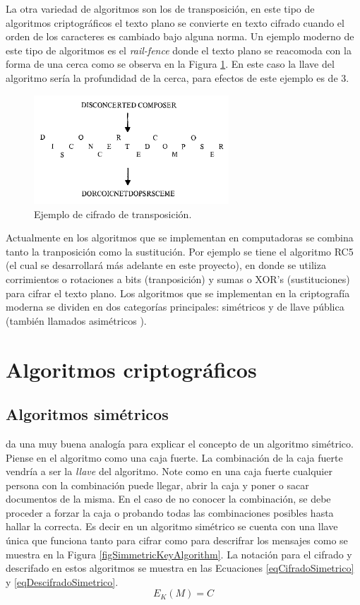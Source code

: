 La otra variedad de algoritmos son los de transposición, en este tipo de algoritmos criptográficos el texto plano se convierte en texto cifrado cuando el orden de los caracteres es cambiado bajo alguna norma. Un ejemplo moderno de este tipo de algoritmos es el \textit{rail-fence} donde el texto plano se reacomoda con la forma de una cerca como se observa en la Figura \ref{figExampleTranspositionCipher}. En este caso la llave del algoritmo sería la profundidad de la cerca, para efectos de este ejemplo es de 3.

\begin{figure}
	\centering
	\includegraphics[width=0.65\textwidth]{./images/figExampleTranspositionCipher}
	\caption{Ejemplo de cifrado de transposición.}
	\label{figExampleTranspositionCipher}
\end{figure}


Actualmente en los algoritmos que se implementan en computadoras se combina tanto la tranposición como la sustitución. Por ejemplo se tiene el algoritmo RC5 (el cual se desarrollará más adelante en este proyecto), en donde se utiliza corrimientos o rotaciones a bits (tranposición) y sumas o XOR's (sustituciones) para cifrar el texto plano. Los algoritmos que se implementan en la criptografía moderna se dividen en dos categorías principales: simétricos y de llave pública (también llamados asimétricos \cite{denning}).


\section{Algoritmos criptográficos}
\subsection{Algoritmos simétricos}
\cite{bruce} da una muy buena analogía para explicar el concepto de un algoritmo simétrico. Piense en el algoritmo como una caja fuerte. La combinación de la caja fuerte vendría a ser la \textit{llave} del algoritmo. Note como en una caja fuerte cualquier persona con la combinación puede llegar, abrir la caja y poner o sacar documentos de la misma. En el caso de no conocer la combinación, se debe proceder a forzar la caja o probando todas las combinaciones posibles hasta hallar la correcta. Es decir en un algoritmo simétrico se cuenta con una llave única que funciona tanto para cifrar como para descrifrar los mensajes como se muestra en la Figura \ref{figSimmetricKeyAlgorithm}. La notación para el cifrado y descrifado en estos algoritmos se muestra en las Ecuaciones \eqref{eqCifradoSimetrico} y \eqref{eqDescifradoSimetrico}.
\begin{equation}\label{eqCifradoSimetrico}
E_K (M) = C
\end{equation}

